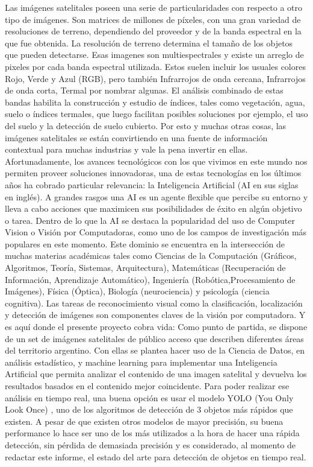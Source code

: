 \documentclass[a4paper,openright,12pt]{report}
\begin{document}
Las imágenes satelitales poseen una serie de particularidades con respecto a otro tipo de imágenes. Son matrices de millones de píxeles, con una gran variedad de resoluciones de terreno, dependiendo del proveedor y de la banda espectral en la que fue obtenida. La resolución de terreno determina el tamaño de los objetos que pueden detectarse. Esas imagenes son multiespectrales y existe un arreglo de pixeles por cada banda espectral utilizada. Estos suelen incluir los usuales colores Rojo, Verde y Azul (RGB), pero también Infrarrojos de onda
cercana, Infrarrojos de onda corta, Termal por nombrar algunas. El análisis combinado de estas bandas habilita la construcción y estudio de índices, tales como vegetación, agua, suelo o índices termales, que luego facilitan posibles soluciones por ejemplo, el uso del suelo y la detección de suelo cubierto. Por esto y muchas otras cosas, las imágenes satelitales se están convirtiendo en una fuente de información contextual para muchas industrias y vale la pena invertir en ellas.
Afortunadamente, los avances tecnológicos con los que vivimos en este mundo nos permiten proveer soluciones innovadoras, una de estas tecnologías en los últimos años ha cobrado particular relevancia: la Inteligencia Artificial (AI en sus siglas en inglés). A grandes rasgos una AI es un agente flexible que percibe su entorno y lleva a cabo acciones que maximicen sus posibilidades de éxito en algún objetivo o tarea. Dentro de lo que la AI se destaca la popularidad del uso de Computer Vision o Visión por Computadoras, como uno de los campos de investigación más populares en este momento. Este dominio se encuentra en la
intersección de muchas materias académicas tales como Ciencias de la Computación (Gráficos, Algoritmos, Teoría, Sistemas, Arquitectura), Matemáticas (Recuperación de Información, Aprendizaje Automático), Ingeniería (Robótica,Procesamiento de Imágenes), Física (Óptica), Biología (neurociencia) y psicología (ciencia cognitiva).
Las tareas de reconocimiento visual como la clasificación, localización y detección de imágenes son componentes claves de la visión por computadora. Y es aquí donde el presente proyecto cobra vida: Como punto de partida, se dispone de un set de imágenes satelitales de público acceso que describen diferentes áreas del territorio argentino. Con ellas se plantea hacer uso de la Ciencia de Datos, en análisis estadístico, y machine learning para implementar una Inteligencia Artificial que permita analizar el contenido de una imagen satelital y devuelva los resultados basados en el contenido mejor coincidente.
Para poder realizar ese análisis en tiempo real, una buena opción es usar el modelo YOLO (You Only Look Once) , uno de los algoritmos de detección de 3 objetos más rápidos que existen. A pesar de que existen otros modelos de mayor precisión, su buena performance lo hace ser uno de los más utilizados a la hora de hacer una rápida detección, sin pérdida de demasiada precisión y es considerado, al momento de redactar este informe, el estado del arte para detección de objetos en tiempo real.
\end{document}
